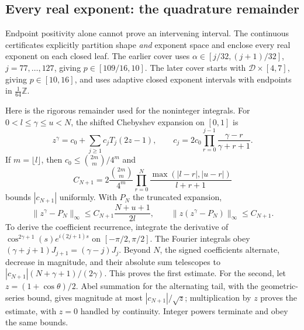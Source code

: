 \documentclass[11pt]{article}
\theoremstyle{definition}
\begin{document}
\subsection{Every real exponent: the quadrature remainder}
Endpoint positivity alone cannot prove an intervening interval. The
continuous certificates explicitly partition shape \emph{and} exponent
space and enclose every real exponent on each closed leaf.
The earlier cover uses $\alpha\in[j/32,(j+1)/32]$,
$j=77,\ldots,127$, giving $p\in[109/16,10]$. The later cover starts with
$\mathcal D\times[4,7]$, giving $p\in[10,16]$, and uses adaptive closed
exponent intervals with endpoints in $\frac1{64}\mathbb Z$.

Here is the rigorous remainder used for the noninteger integrals.
For $0<l\le\gamma\le u<N$, the shifted Chebyshev expansion on $[0,1]$ is
\[
 z^\gamma=c_0+\sum_{j\ge1}c_jT_j(2z-1),\qquad
 c_j=2c_0\prod_{r=0}^{j-1}\frac{\gamma-r}{\gamma+r+1}.
\]
If $m=\lfloor l\rfloor$, then $c_0\le\binom{2m}{m}/4^m$ and
\[
 C_{N+1}=2\frac{\binom{2m}{m}}{4^m}
          \prod_{r=0}^N\frac{\max(|l-r|,|u-r|)}{l+r+1}
\]
bounds $|c_{N+1}|$ uniformly. With $P_N$ the truncated expansion,
\begin{equation}\label{eq:cheb}
 \|z^\gamma-P_N\|_\infty\le C_{N+1}\frac{N+u+1}{2l},\qquad
 \|z(z^\gamma-P_N)\|_\infty\le C_{N+1}.
\end{equation}
To derive the coefficient recurrence, integrate the derivative of
$\cos^{2\gamma+1}(s)e^{i(2j+1)s}$ on $[-\pi/2,\pi/2]$.
The Fourier integrals obey
$(\gamma+j+1)J_{j+1}=(\gamma-j)J_j$.
Beyond $N$, the signed coefficients alternate, decrease in magnitude,
and their absolute sum telescopes to
$|c_{N+1}|(N+\gamma+1)/(2\gamma)$. This proves the first estimate.
For the second, let $z=(1+\cos\theta)/2$. Abel summation for the alternating
tail, with the geometric-series bound, gives magnitude at most
$|c_{N+1}|/\sqrt z$; multiplication by $z$ proves the estimate, with $z=0$
handled by continuity. Integer powers terminate and obey the same bounds.
\end{document}
